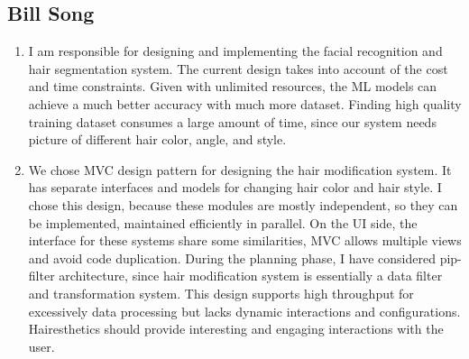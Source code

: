 \documentclass[12pt, titlepage]{article}
\begin{document}
\subsection{Bill Song}
\begin{enumerate}
    \item I am responsible for designing and implementing the facial recognition and hair segmentation system. The current design takes into account of the cost and time constraints. Given with unlimited resources, the ML models can achieve a much better accuracy with much more dataset. Finding high quality training dataset consumes a large amount of time, since our system needs picture of different hair color, angle, and style.
    \item We chose MVC design pattern for designing the hair modification system. It has separate interfaces and models for changing hair color and hair style. I chose this design, because these modules are mostly independent, so they can be implemented, maintained efficiently in parallel. On the UI side, the interface for these systems share some similarities, MVC allows multiple views and avoid code duplication. During the planning phase, I have considered pip-filter architecture, since hair modification system is essentially a data filter and transformation system. This design supports high throughput for excessively data processing but lacks dynamic interactions and configurations. Hairesthetics should provide interesting and engaging interactions with the user.
\end{enumerate}
\end{document}
